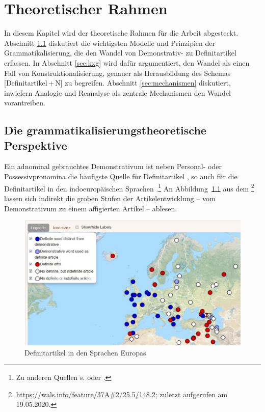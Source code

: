 \chapter{Theoretischer Rahmen} \label{chapter:theorie}

In diesem Kapitel wird der theoretische Rahmen für die Arbeit abgesteckt. 
Abschnitt \ref{sec:gram} diskutiert die wichtigsten Modelle und Prinzipien  der Grammatikalisierung, die den Wandel von Demonstrativ- zu Definitartikel erfassen. In Abschnitt \ref{sec:kxg} wird dafür argumentiert, den Wandel als einen Fall von Konstruktionalisierung, genauer als Herausbildung des Schemas [Definitartikel\,+\,N] zu begreifen. Abschnitt \ref{sec:mechanismen} diskutiert, inwiefern Analogie und Reanalyse als zentrale Mechanismen den Wandel vorantreiben.   

\section{Die grammatikalisierungstheoretische Perspektive}\label{sec:gram}

Ein adnominal gebrauchtes Demonstrativum ist neben Personal- oder Possessivpronomina die häufigste Quelle für Definitartikel \parencites()(){Himmelmann1997}[215]{Heine2002}, so auch für die Definitartikel in den indoeuropäischen Sprachen \parencite{vonHeusinger2013}.\footnote{Zu anderen Quellen s. \textcite[839]{Himmelmann2001} oder \textcite[523]{deMulder2011}.}
An Abbildung~\ref{wals} aus dem \footnote{\url{https://wals.info/feature/37A\#2/25.5/148.2}; zuletzt aufgerufen am 19.05.2020.} lassen sich indirekt die groben Stufen der Artikelentwicklung -- vom Demonstrativum zu einem affigierten Artikel -- ablesen. 

\begin{figure}
\begin{center}
  \includegraphics[width=\textwidth]{images/wals.jpg}
\caption {Definitartikel in den Sprachen Europas \parencite{Dryer2013}}
\label{wals}
\end{center}
\end{figure} 

